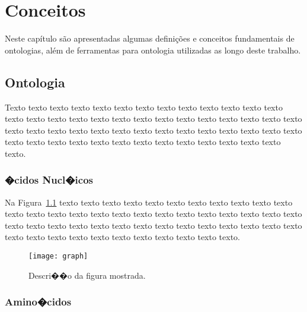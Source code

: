\chapter{Conceitos}
\label{cap:conceitos}

Neste capítulo são apresentadas algumas definições e conceitos fundamentais de 
ontologias, além de ferramentas para ontologia utilizadas as longo deste trabalho.

\section{Ontologia}
\label{sec:fundamentos}

Texto texto texto texto texto texto texto texto texto texto texto texto texto
texto texto texto texto texto texto texto texto texto texto texto texto texto
texto texto texto texto texto texto texto texto texto texto texto texto texto
texto texto texto texto texto texto texto texto texto texto texto texto texto
texto texto texto.

\subsection{�cidos Nucl�icos}
\label{sec:acidos_nucleicos}

Na Figura~\ref{fig:humanbeta} texto texto texto texto texto texto texto texto
texto texto texto texto texto texto texto texto texto texto texto texto texto
texto texto texto texto texto texto texto texto texto texto texto texto texto
texto texto texto texto texto texto texto texto texto texto texto texto texto
texto texto texto.

\begin{figure}[!h]
  \centering
  \texttt{[image: graph]} 
  \caption{Descri��o da figura mostrada.}
  \label{fig:humanbeta} 
\end{figure}

\subsection{Amino�cidos}
\label{sec:amino_acidos}

